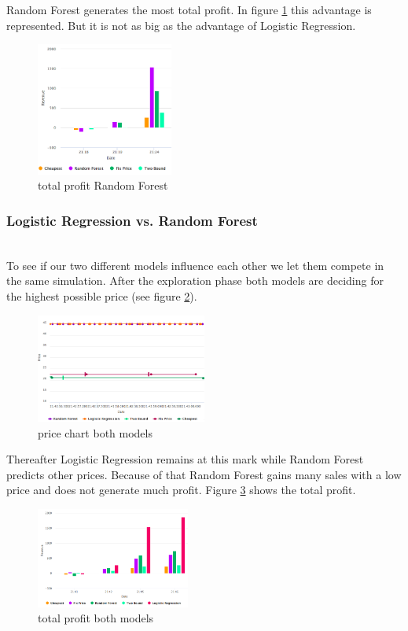     Random Forest generates the most total profit. In figure \ref{fig6} this advantage is represented. But it is not as big as the advantage of Logistic Regression.

    \begin{figure}[ht]
        \centering
        \includegraphics[width=0.4\textwidth]{img/rndmfrst_total_profit.png}
        \caption{total profit Random Forest}
        \label{fig6}
    \end{figure} 


\subsubsection{Logistic Regression vs. Random Forest}
    ~\\
    To see if our two different models influence each other we let them compete in the same simulation. After the exploration phase both models are deciding for the highest possible price (see figure \ref{fig7}).
    \begin{figure}[ht]
        \centering
        \includegraphics[width=0.5\textwidth]{img/prices_both.png}
        \caption{price chart both models}
        \label{fig7}
    \end{figure} 

    Thereafter Logistic Regression remains at this mark while Random Forest predicts other prices. Because of that Random Forest gains many sales with a low price and does not generate much profit. Figure \ref{fig8} shows the total profit.

    \begin{figure}[ht]
        \centering
        \includegraphics[width=0.45\textwidth]{img/total_profit_both.png}
        \caption{total profit both models}
        \label{fig8}
    \end{figure} 


